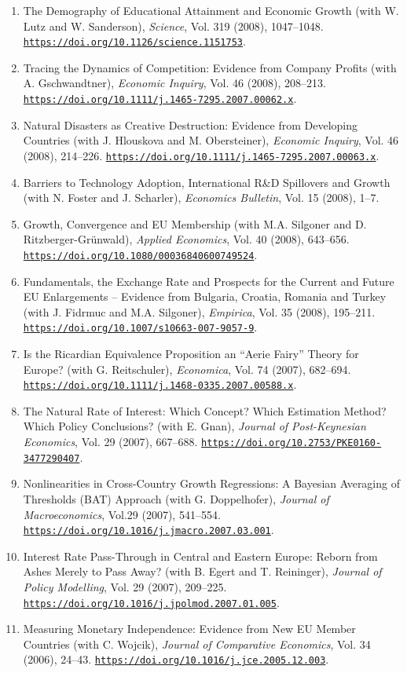 \documentclass[10pt]{res} %
\newcommand{\doiurl}[1]{\href{https://doi.org/#1}{\nolinkurl{https://doi.org/#1}}}
\begin{document}
\begin{resume}
\begin{enumerate}
\item The Demography of Educational Attainment and Economic Growth (with W. Lutz and W. Sanderson), \textit{Science}, Vol. 319 (2008), 1047--1048. \doiurl{10.1126/science.1151753}.
\item Tracing the Dynamics of Competition: Evidence from Company Profits (with A. Gschwandtner), \textit{Economic Inquiry}, Vol. 46 (2008), 208--213. \doiurl{10.1111/j.1465-7295.2007.00062.x}.
\item Natural Disasters as Creative Destruction: Evidence from Developing Countries (with J. Hlouskova and M. Obersteiner), \textit{Economic Inquiry}, Vol. 46 (2008), 214--226. \doiurl{10.1111/j.1465-7295.2007.00063.x}.
\item Barriers to Technology Adoption, International R\&D Spillovers and Growth (with N. Foster and J. Scharler),\textit{ Economics Bulletin}, Vol. 15 (2008), 1--7.
\item Growth, Convergence and EU Membership (with M.A. Silgoner and D. Ritzberger-Gr\"unwald), \textit{Applied Economics}, Vol. 40 (2008), 643--656. \doiurl{10.1080/00036840600749524}.
\item Fundamentals, the Exchange Rate and Prospects for the Current and Future EU Enlargements -- Evidence from Bulgaria, Croatia, Romania and Turkey (with J. Fidrmuc and M.A. Silgoner), \textit{Empirica}, Vol. 35 (2008), 195--211. \doiurl{10.1007/s10663-007-9057-9}.
\item Is the Ricardian Equivalence Proposition an ``Aerie Fairy'' Theory for Europe? (with G. Reitschuler), \textit{Economica}, Vol. 74 (2007), 682--694. \doiurl{10.1111/j.1468-0335.2007.00588.x}.
\item The Natural Rate of Interest: Which Concept? Which Estimation Method? Which Policy Conclusions? (with E. Gnan), \textit{Journal of Post-Keynesian Economics}, Vol. 29 (2007), 667--688. \doiurl{10.2753/PKE0160-3477290407}.
\item Nonlinearities in Cross-Country Growth Regressions: A Bayesian Averaging of Thresholds (BAT) Approach (with G. Doppelhofer), \textit{Journal of Macroeconomics}, Vol.29 (2007), 541--554. \doiurl{10.1016/j.jmacro.2007.03.001}.
\item Interest Rate Pass-Through in Central and Eastern Europe: Reborn from Ashes Merely to Pass Away? (with B. Egert and T. Reininger), \textit{Journal of Policy Modelling}, Vol. 29 (2007), 209--225. \doiurl{10.1016/j.jpolmod.2007.01.005}.
\item Measuring Monetary Independence: Evidence from New EU Member Countries (with C. Wojcik), \textit{Journal of Comparative Economics}, Vol. 34 (2006), 24--43. \doiurl{10.1016/j.jce.2005.12.003}.

\end{enumerate}
\end{resume}
\end{document}
